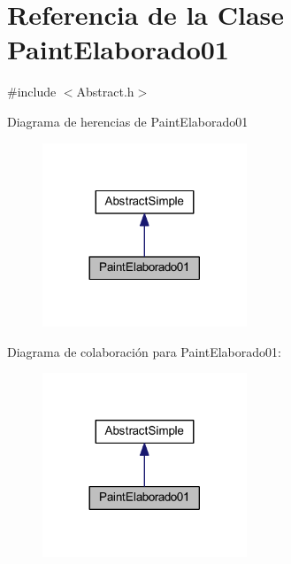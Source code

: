 \hypertarget{class_paint_elaborado01}{}\section{Referencia de la Clase Paint\+Elaborado01}
\label{class_paint_elaborado01}


{\ttfamily \#include $<$Abstract.\+h$>$}



Diagrama de herencias de Paint\+Elaborado01
\nopagebreak
\begin{figure}[H]
\begin{center}
\leavevmode
\includegraphics[width=173pt]{class_paint_elaborado01__inherit__graph}
\end{center}
\end{figure}


Diagrama de colaboración para Paint\+Elaborado01\+:
\nopagebreak
\begin{figure}[H]
\begin{center}
\leavevmode
\includegraphics[width=173pt]{class_paint_elaborado01__coll__graph}
\end{center}
\end{figure}
